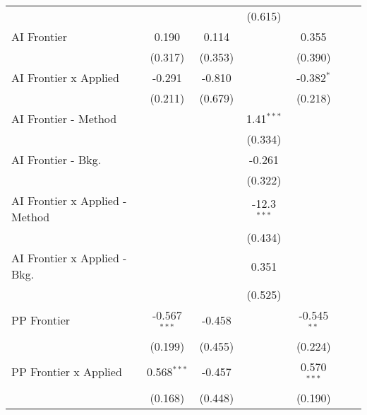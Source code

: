\begin{tabular}{lcccccc}
                                  &                &               & (0.615)       &               &         &   \\   
   AI Frontier                    & 0.190          & 0.114         &               & 0.355         &         &   \\   
                                  & (0.317)        & (0.353)       &               & (0.390)       &         &   \\   
   AI Frontier x Applied          & -0.291         & -0.810        &               & -0.382$^{*}$  &         &   \\   
                                  & (0.211)        & (0.679)       &               & (0.218)       &         &   \\   
   AI Frontier - Method           &                &               & 1.41$^{***}$  &               &         &   \\   
                                  &                &               & (0.334)       &               &         &   \\   
   AI Frontier - Bkg.             &                &               & -0.261        &               &         &   \\   
                                  &                &               & (0.322)       &               &         &   \\   
   AI Frontier x Applied - Method &                &               & -12.3$^{***}$ &               &         &   \\   
                                  &                &               & (0.434)       &               &         &   \\   
   AI Frontier x Applied - Bkg.   &                &               & 0.351         &               &         &   \\   
                                  &                &               & (0.525)       &               &         &   \\   
   PP Frontier                    & -0.567$^{***}$ & -0.458        &               & -0.545$^{**}$ &         &   \\   
                                  & (0.199)        & (0.455)       &               & (0.224)       &         &   \\   
   PP Frontier x Applied          & 0.568$^{***}$  & -0.457        &               & 0.570$^{***}$ &         &   \\   
                                  & (0.168)        & (0.448)       &               & (0.190)       &         &   \\   

\end{tabular}
